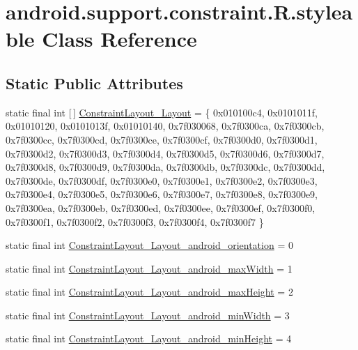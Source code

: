 \hypertarget{classandroid_1_1support_1_1constraint_1_1R_1_1styleable}{}\section{android.\+support.\+constraint.\+R.\+styleable Class Reference}
\label{classandroid_1_1support_1_1constraint_1_1R_1_1styleable}
\subsection*{Static Public Attributes}
\begin{DoxyCompactItemize}
\item 
static final int \mbox{[}$\,$\mbox{]} \mbox{\hyperlink{classandroid_1_1support_1_1constraint_1_1R_1_1styleable_a96a3757da6f0c088e10cc55aa2a6ed9f}{Constraint\+Layout\+\_\+\+Layout}} = \{ 0x010100c4, 0x0101011f, 0x01010120, 0x0101013f, 0x01010140, 0x7f030068, 0x7f0300ca, 0x7f0300cb, 0x7f0300cc, 0x7f0300cd, 0x7f0300ce, 0x7f0300cf, 0x7f0300d0, 0x7f0300d1, 0x7f0300d2, 0x7f0300d3, 0x7f0300d4, 0x7f0300d5, 0x7f0300d6, 0x7f0300d7, 0x7f0300d8, 0x7f0300d9, 0x7f0300da, 0x7f0300db, 0x7f0300dc, 0x7f0300dd, 0x7f0300de, 0x7f0300df, 0x7f0300e0, 0x7f0300e1, 0x7f0300e2, 0x7f0300e3, 0x7f0300e4, 0x7f0300e5, 0x7f0300e6, 0x7f0300e7, 0x7f0300e8, 0x7f0300e9, 0x7f0300ea, 0x7f0300eb, 0x7f0300ed, 0x7f0300ee, 0x7f0300ef, 0x7f0300f0, 0x7f0300f1, 0x7f0300f2, 0x7f0300f3, 0x7f0300f4, 0x7f0300f7 \}
\item 
static final int \mbox{\hyperlink{classandroid_1_1support_1_1constraint_1_1R_1_1styleable_a36f52fed28919d0372e03cc70150f880}{Constraint\+Layout\+\_\+\+Layout\+\_\+android\+\_\+orientation}} = 0
\item 
static final int \mbox{\hyperlink{classandroid_1_1support_1_1constraint_1_1R_1_1styleable_a325d89e861b9f5497a3232f571c40ec4}{Constraint\+Layout\+\_\+\+Layout\+\_\+android\+\_\+max\+Width}} = 1
\item 
static final int \mbox{\hyperlink{classandroid_1_1support_1_1constraint_1_1R_1_1styleable_adf760fb5ee1563b2ba152b3fb0a72f81}{Constraint\+Layout\+\_\+\+Layout\+\_\+android\+\_\+max\+Height}} = 2
\item 
static final int \mbox{\hyperlink{classandroid_1_1support_1_1constraint_1_1R_1_1styleable_a8ce686526634e93a8951dc1a3e160d80}{Constraint\+Layout\+\_\+\+Layout\+\_\+android\+\_\+min\+Width}} = 3
\item 
static final int \mbox{\hyperlink{classandroid_1_1support_1_1constraint_1_1R_1_1styleable_a0ed9f5ad83856f043b752deff63d9bc1}{Constraint\+Layout\+\_\+\+Layout\+\_\+android\+\_\+min\+Height}} = 4

\end{DoxyCompactItemize}
